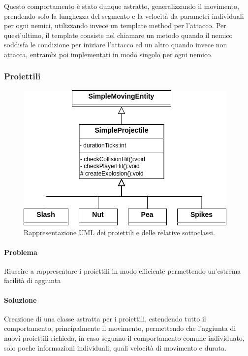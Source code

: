 \documentclass[a4paper,12pt]{report}
\begin{document}
    Questo comportamento è stato dunque astratto, generalizzando il movimento, prendendo solo la lunghezza del segmento e la velocità da parametri individuali per ogni nemici, utilizzando invece un template method per l’attacco. Per quest’ultimo, il template consiste nel chiamare un metodo quando il nemico soddisfa le condizione per iniziare l’attacco ed un altro quando invece non attacca, entrambi poi implementati in modo singolo per ogni nemico.

    \subsubsection{Proiettili}

    \begin{figure}[H]
        \centering{}
        \includegraphics[scale=0.6] {img/projectiles.png}
        \caption{Rappresentazione UML dei proiettili e delle relative sottoclassi.}
        \label{img:projectiles}
    \end{figure}

    \paragraph{Problema} Riuscire a rappresentare i proiettili in modo efficiente permettendo un’estrema facilità di aggiunta

    \paragraph{Soluzione} Creazione di una classe astratta per i proiettili, estendendo tutto il comportamento, principalmente il movimento, permettendo che l’aggiunta di nuovi proiettili richieda, in caso seguano il comportamento comune individuato, solo poche informazioni individuali, quali velocità di movimento e durata.
\end{document}
